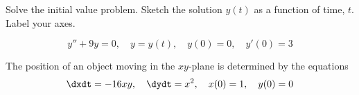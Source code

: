 \documentclass[12pt]{exam}
\begin{document}
    


\newpage

\begin{questions}


\newpage 

    \question[10]  Solve the initial value problem. Sketch the solution $y(t)$ as a function of time, $t$. Label your axes. 

    $$y'' + 9y = 0, \quad y = y(t), \quad y(0) = 0, \quad y'(0) = 3$$
    

    \newpage
    
    \question[10] The position of an object moving in the $xy$-plane is determined by the equations
    $$ \dxdt = -16xy, \quad \dydt = x^2, \quad x(0) = 1, \quad y(0) = 0$$ %
    
    
\end{questions}
\end{document}
